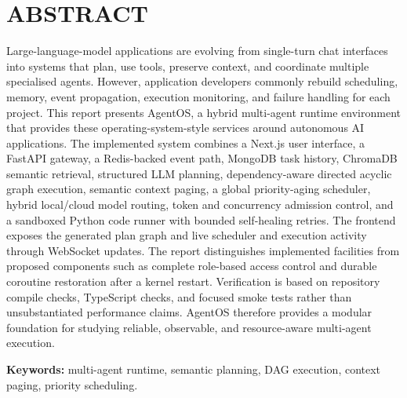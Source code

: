 \chapter*{\uppercase{ABSTRACT}}

Large-language-model applications are evolving from single-turn chat interfaces into systems that plan, use tools, preserve context, and coordinate multiple specialised agents. However, application developers commonly rebuild scheduling, memory, event propagation, execution monitoring, and failure handling for each project. This report presents AgentOS, a hybrid multi-agent runtime environment that provides these operating-system-style services around autonomous AI applications. The implemented system combines a Next.js user interface, a FastAPI gateway, a Redis-backed event path, MongoDB task history, ChromaDB semantic retrieval, structured LLM planning, dependency-aware directed acyclic graph execution, semantic context paging, a global priority-aging scheduler, hybrid local/cloud model routing, token and concurrency admission control, and a sandboxed Python code runner with bounded self-healing retries. The frontend exposes the generated plan graph and live scheduler and execution activity through WebSocket updates. The report distinguishes implemented facilities from proposed components such as complete role-based access control and durable coroutine restoration after a kernel restart. Verification is based on repository compile checks, TypeScript checks, and focused smoke tests rather than unsubstantiated performance claims. AgentOS therefore provides a modular foundation for studying reliable, observable, and resource-aware multi-agent execution.

\textbf{Keywords:} multi-agent runtime, semantic planning, DAG execution, context paging, priority scheduling.

